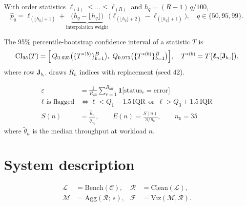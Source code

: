 \documentclass[10pt]{article}
\begin{document}
With order statistics $\ell_{(1)}\le\dots\le\ell_{(R)}$ and $h_q=(R-1)\,q/100$,
\begin{equation}
\hat p_q=\ell_{(\lfloor h_q\rfloor+1)}+\underbrace{\bigl(h_q-\lfloor h_q\rfloor\bigr)}_{\text{interpolation weight}}
\bigl(\ell_{(\lfloor h_q\rfloor+2)}-\ell_{(\lfloor h_q\rfloor+1)}\bigr),
\quad q\in\{50,95,99\}.
\label{eq:percentile}
\end{equation}

The 95\% percentile-bootstrap confidence interval of a statistic $T$ is
\begin{equation}
\mathrm{CI}_{95}(T)=\Bigl[\,Q_{0.025}\bigl(\{T^{*(b)}\}_{b=1}^{B}\bigr),\;
Q_{0.975}\bigl(\{T^{*(b)}\}_{b=1}^{B}\bigr)\Bigr],
\quad T^{*(b)}=T\bigl(\boldsymbol{\ell}_n[\mathbf{J}_{b,\cdot}]\bigr),
\label{eq:bootstrap}
\end{equation}
where row $\mathbf{J}_{b,\cdot}$ draws $R_n$ indices with replacement (seed $42$).

\begin{align}
\varepsilon &= \frac{1}{R_{\mathrm{all}}}\sum_{r=1}^{R_{\mathrm{all}}}
\mathbf{1}\bigl[\mathrm{status}_r=\text{error}\bigr]
\label{eq:error}\\
\ell \text{ is flagged} &\iff \ell<Q_1-1.5\,\mathrm{IQR}\ \ \text{or}\ \ \ell>Q_3+1.5\,\mathrm{IQR}
\label{eq:iqr}\\
S(n)&=\frac{\tilde\theta_{n}}{\tilde\theta_{n_0}},\qquad
E(n)=\frac{S(n)}{n/n_0},\qquad n_0=35
\label{eq:speedup}
\end{align}
where $\tilde\theta_n$ is the median throughput at workload $n$.

\section*{System description}
\begin{align}
\mathcal{L}&=\mathrm{Bench}(\mathcal{C}), &
\mathcal{R}&=\mathrm{Clean}(\mathcal{L}),\\
\mathcal{M}&=\mathrm{Agg}(\mathcal{R};\,s), &
\mathcal{F}&=\mathrm{Viz}(\mathcal{M},\mathcal{R}).
\end{align}
\end{document}
